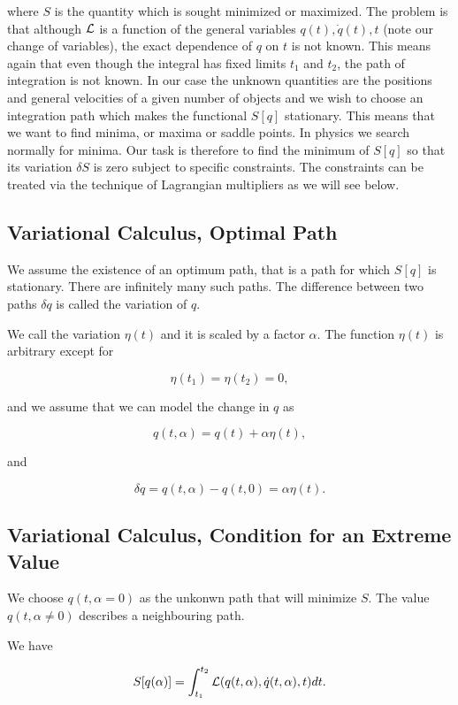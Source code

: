 \documentclass[%
oneside,                 %
final,                   %
10pt]{article}
\begin{document}
where $S$ is the quantity which is sought minimized or maximized.  The
problem is that although ${\cal L}$  is a function of the general variables
$q(t),\dot{q}(t),t$ (note our change of variables), the exact dependence of $q$ on $t$ is not known.
This means again that even though the integral has fixed limits $t_1$
and $t_2$, the path of integration is not known. In our case the unknown
quantities are the positions and general velocities of a given number
of objects and we wish to choose an integration path which makes the
functional $S[q]$ stationary. This means that we want to find minima,
or maxima or saddle points. In physics we search normally for minima.
Our task is therefore to find the minimum of $S[q]$ so that its
variation $\delta S$ is zero subject to specific constraints.  The
constraints can be treated via the technique of Lagrangian multipliers
as we will see below.

\subsection*{Variational Calculus, Optimal Path}

We assume the existence of an optimum path, that is a path for which
$S[q]$ is stationary. There are infinitely many such paths.  The
difference between two paths $\delta q$ is called the variation of
$q$.

We call the variation $\eta(t)$ and it is scaled by a factor $\alpha$.
The function $\eta(t)$ is arbitrary except for

\[
\eta(t_1)=\eta(t_2)=0,
\]

and we assume that we can model the change in $q$ as

\[
q(t,\alpha) = q(t)+\alpha\eta(t),
\]

and

\[
\delta q = q(t,\alpha) -q(t,0)=\alpha\eta(t).
\]

\subsection*{Variational Calculus, Condition for an Extreme Value}

We choose $q(t,\alpha=0)$ as the unkonwn path  that will minimize $S$.  The value
$q(t,\alpha\ne 0)$  describes a neighbouring path.

We have

\[
S[q(\alpha)]= \int_{t_1}^{t_2} {\cal L}(q(t,\alpha),\dot{q}(t,\alpha),t)dt.
\]
\end{document}
